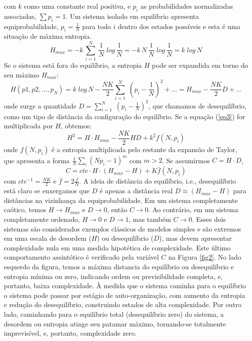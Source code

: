 \documentclass[
	12pt,				%
	openany,oneside,
	a4paper,			%
	english,			%
	brazil,				%
	]{abntex2}
\begin{document}
com $k$ como uma constante real positiva, e $p_i$ as probabilidades normalizadas associadas,
$\sum p_i = 1$. Um sistema isolado em equilíbrio apresenta equiprobabilidade, $p_i = \frac{1}{N}$ para todo $i$ dentro dos estados possíveis e esta é uma situação de máxima entropia.
\begin{equation}
H_{max} =  -k \, \sum^N_{i=1} \, \frac{1}{N}  \; log \, \frac{1}{N}  = -k \, N \, \frac{1}{N} \; log \, \frac{1}{N} = k \; log \, N
\end{equation}
Se o sistema está fora do equilíbrio, a entropia $H$ pode ser expandida em torno do seu máximo $H_{max}$:
\begin{equation}
\label{eq3}
H(p1,p2, \ldots , p_N) = k \; log \, N - \frac{NK}{2} \sum^N_{i=1} \; \left( p_i - \frac{1}{N} \right)^2 + \ldots = H_{max} - \frac{NK}{2}D + \ldots
\end{equation}
onde surge a quantidade $D = \sum^N_{i=1} \; \left( p_i - \frac{1}{N} \right)^2$, que chamamos de desequilíbrio, como um tipo de distância da configuração do equilíbrio. Se a equação (\ref{eq3}) for multiplicada por $H$, obtemos: 
\begin{equation}
H^2 = H \cdot H_{max} - \frac{NK}{2}HD + k^2 f(N,p_i)
\end{equation}
onde $f(N,p_i)$	é a entropia multiplicada pelo restante da expansão de Taylor, que apresenta a forma
$\frac{1}{N} \sum_i (N p_i - 1)^{m}$ com $m>2$. Se assumirmos $C=H \cdot D$,
\begin{equation}
C = cte \cdot H \cdot (H_{max} - H) + K \bar{f}(N,p_i)
\end{equation}
com $cte^{-1}= \frac{NK}{2}$ e $\bar{f} = 2\frac{f}{N}$. A ideia de distância do equilíbrio, i.e., desequilíbrio está claro se enxergamos que $D$ é apenas a distância real 
$D \approx (H_{max}-H)$ %
para distâncias na vizinhança da equiprobabilidade. Em um sistema completamente caótico, temos $H \to H_{max}$ e $D \to 0$, então $C \to 0$. Ao contrário, em um sistema completamente ordenado, $H \to 0$ e $D \to 1$, mas também $C \to 0$. Esses dois sistemas são considerados exemplos clássicos de modelos simples e são extremos em uma escala de desordem ($H$) ou desequilíbrio ($D$), mas devem apresentar complexidade nula em uma medida hipotética de complexidade. Este último comportamento assintótico é verificado pela variável $C$ na Figura \ref{fig2}. No lado esquerdo da figura, temos a máxima distancia do equilíbrio ou desequilíbrio e entropia mínima ou zero, indicando ordem ou previsibilidade completa, e, portanto, baixa complexidade. À medida que o sistema caminha para o equilíbrio o sistema pode passar por estágio de auto-organização, com aumento da entropia e redução do desequilíbrio, construindo estados de alta complexidade. Por outro lado, caminhando para o equilíbrio total (desequilíbrio zero) do sistema, a desordem ou entropia atinge seu patamar máximo, tornando-se totalmente imprevisível, e, portanto, complexidade zero.
\end{document}

